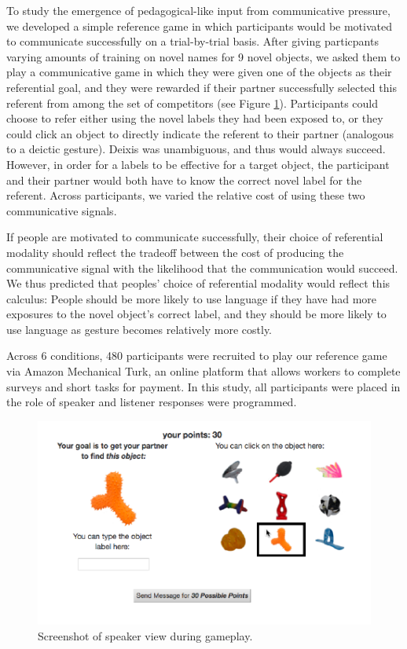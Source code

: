 \documentclass[10pt, letterpaper]{article}
\newenvironment{CodeChunk}{}{}
\begin{document}
To study the emergence of pedagogical-like input from communicative
pressure, we developed a simple reference game in which participants
would be motivated to communicate successfully on a trial-by-trial
basis. After giving particpants varying amounts of training on novel
names for 9 novel objects, we asked them to play a communicative game in
which they were given one of the objects as their referential goal, and
they were rewarded if their partner successfully selected this referent
from among the set of competitors (see Figure \ref{fig:exp_screenshot}).
Participants could choose to refer either using the novel labels they
had been exposed to, or they could click an object to directly indicate
the referent to their partner (analogous to a deictic gesture). Deixis
was unambiguous, and thus would always succeed. However, in order for a
labels to be effective for a target object, the participant and their
partner would both have to know the correct novel label for the
referent. Across participants, we varied the relative cost of using
these two communicative signals.

If people are motivated to communicate successfully, their choice of
referential modality should reflect the tradeoff between the cost of
producing the communicative signal with the likelihood that the
communication would succeed. We thus predicted that peoples' choice of
referential modality would reflect this calculus: People should be more
likely to use language if they have had more exposures to the novel
object's correct label, and they should be more likely to use language
as gesture becomes relatively more costly.

Across 6 conditions, 480 participants were recruited to play our
reference game via Amazon Mechanical Turk, an online platform that
allows workers to complete surveys and short tasks for payment. In this
study, all participants were placed in the role of speaker and listener
responses were programmed.

\begin{CodeChunk}
\begin{figure}[H]

{\centering \includegraphics{figs/exp_screenshot-1} 

}

\caption[Screenshot of speaker view during gameplay]{Screenshot of speaker view during gameplay.}\label{fig:exp_screenshot}
\end{figure}
\end{CodeChunk}
\end{document}
